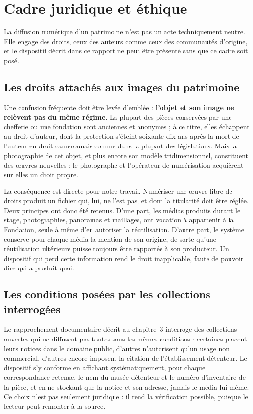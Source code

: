\section{Cadre juridique et éthique}
\label{sec:juridique}

La diffusion numérique d'un patrimoine n'est pas un acte techniquement neutre.
Elle engage des droits, ceux des auteurs comme ceux des communautés d'origine,
et le dispositif décrit dans ce rapport ne peut être présenté sans que ce cadre
soit posé.

\subsection{Les droits attachés aux images du patrimoine}

Une confusion fréquente doit être levée d'emblée : \textbf{l'objet et son image
ne relèvent pas du même régime}. La plupart des pièces conservées par une
chefferie ou une fondation sont anciennes et anonymes ; à ce titre, elles
échappent au droit d'auteur, dont la protection s'éteint soixante-dix ans après
la mort de l'auteur en droit camerounais comme dans la plupart des législations.
Mais la photographie de cet objet, et plus encore son modèle tridimensionnel,
constituent des œuvres nouvelles : le photographe et l'opérateur de
numérisation acquièrent sur elles un droit propre.

La conséquence est directe pour notre travail. Numériser une œuvre libre de
droits produit un fichier qui, lui, ne l'est pas, et dont la titularité doit
être réglée. Deux principes ont donc été retenus. D'une part, les médias
produits durant le stage, photographies, panoramas et maillages, ont vocation à
appartenir à la Fondation, seule à même d'en autoriser la réutilisation.
D'autre part, le système conserve pour chaque média la mention de son origine,
de sorte qu'une réutilisation ultérieure puisse toujours être rapportée à son
producteur. Un dispositif qui perd cette information rend le droit
inapplicable, faute de pouvoir dire qui a produit quoi.

\subsection{Les conditions posées par les collections interrogées}

Le rapprochement documentaire décrit au chapitre~3 interroge des collections
ouvertes qui ne diffusent pas toutes sous les mêmes conditions : certaines
placent leurs notices dans le domaine public, d'autres n'autorisent qu'un usage
non commercial, d'autres encore imposent la citation de l'établissement
détenteur. Le dispositif s'y conforme en affichant systématiquement, pour chaque
correspondance retenue, le nom du musée détenteur et le numéro d'inventaire de
la pièce, et en ne stockant que la notice et son adresse, jamais le média
lui-même. Ce choix n'est pas seulement juridique : il rend la vérification
possible, puisque le lecteur peut remonter à la source.

